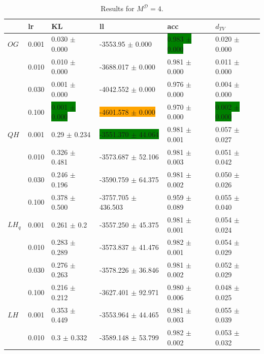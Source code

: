 \documentclass[shortabstract]{iithesis}
\begin{document}
\pagebreak 

\begin{table}[!ht]
\centering
\caption{Results for $M^{\mathcal D}=4$.}
\vspace{5mm}
\begin{tabular}{llllll}  \hline
& lr &   KL &                      ll &               acc &              $d_{TV}$ \\ \hline
$OG$ & 0.001 &     0.030 $\pm$ 0.000 &       -3553.95 $\pm$ 0.000 &    \colorbox{green}{0.983 $\pm$ 0.000} &     0.020 $\pm$ 0.000 \\
        & 0.010 &     0.010 $\pm$ 0.000 &      -3688.017 $\pm$ 0.000 &    0.981 $\pm$ 0.000 &    0.011 $\pm$ 0.000 \\
        & 0.030 &    0.001 $\pm$ 0.000 &      -4042.552 $\pm$ 0.000 &    0.976 $\pm$ 0.000 &    0.004 $\pm$ 0.000 \\
        & 0.100 &    \colorbox{green}{0.001 $\pm$ 0.000} &      \colorbox{orange}{-4601.578 $\pm$ 0.000} &     0.970 $\pm$ 0.000 &    \colorbox{green}{0.002 $\pm$ 0.000} \\
$QH$ & 0.001 &   0.29 $\pm$ 0.234 &    \colorbox{green}{-3551.370 $\pm$ 44.064} &  0.981 $\pm$ 0.001 &  0.057 $\pm$ 0.027 \\
        & 0.010 &  0.326 $\pm$ 0.481 &   -3573.687 $\pm$ 52.106 &  0.981 $\pm$ 0.003 &  0.051 $\pm$ 0.042 \\
        & 0.030 &  0.246 $\pm$ 0.196 &   -3590.759 $\pm$ 64.375 &  0.981 $\pm$ 0.002 &   0.050 $\pm$ 0.026 \\
        & 0.100 &    0.378 $\pm$ 0.500 &  -3757.705 $\pm$ 436.503 &  0.959 $\pm$ 0.089 &   0.055 $\pm$ 0.040 \\
$LH_q$ & 0.001 &    0.261 $\pm$ 0.2 &    -3557.250 $\pm$ 45.375 &  0.981 $\pm$ 0.001 &  0.054 $\pm$ 0.024 \\
        & 0.010 &  0.283 $\pm$ 0.289 &   -3573.837 $\pm$ 41.476 &  0.982 $\pm$ 0.001 &  0.054 $\pm$ 0.029 \\
        & 0.030 &  0.276 $\pm$ 0.263 &   -3578.226 $\pm$ 36.846 &  0.981 $\pm$ 0.002 &  0.052 $\pm$ 0.029 \\
        & 0.100 &  0.216 $\pm$ 0.212 &   -3627.401 $\pm$ 92.971 &   0.980 $\pm$ 0.006 &  0.048 $\pm$ 0.025 \\
$LH$ & 0.001 &  0.353 $\pm$ 0.449 &   -3553.964 $\pm$ 44.465 &  0.981 $\pm$ 0.003 &  0.055 $\pm$ 0.039 \\
        & 0.010 &    0.3 $\pm$ 0.332 &   -3589.148 $\pm$ 53.799 &  0.982 $\pm$ 0.002 &  0.053 $\pm$ 0.032 \\

\end{tabular}
\end{table}
\end{document}
